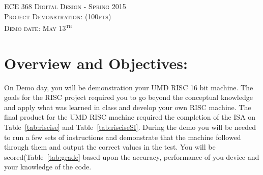 \documentclass{article}
\begin{document}
\begin{center}
\textsc{\huge ECE 368 Digital Design - Spring 2015}\\[1cm]
\textsc{{\LARGE Project Demonstration: (100pts)}}\\[0.5cm]
\textsc{\Large Demo date: May $13$\textsuperscript{th}}\\[0.5cm]
\end{center}

\section{Overview and Objectives:}
On Demo day, you will be demonstration your UMD RISC 16 bit machine. The goals for the RISC project required you to go beyond the conceptual knowledge and apply what was learned in class and develop your own RISC machine. The final product for the UMD RISC machine required the completion of the ISA on Table~\ref{tab:riscise} and Table~\ref{tab:risciseSI}. During the demo you will be needed to run a few sets of instructions and demonstrate that the machine followed through them and output the correct values in the test. You will be scored(Table~\ref{tab:grade} based upon the accuracy, performance of you device and your knowledge of the code. 
\end{document}
